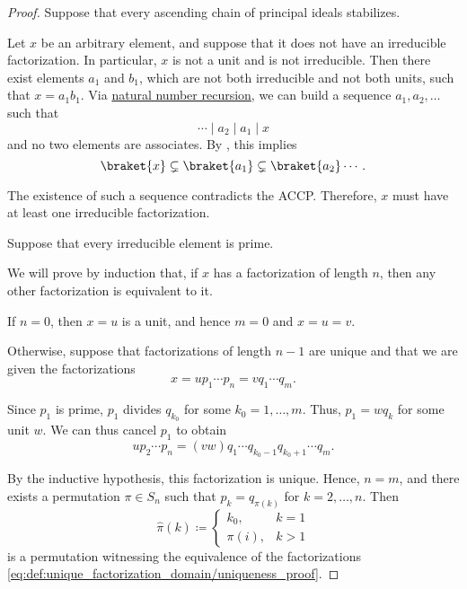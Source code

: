 \begin{proof}
   Suppose that every ascending chain of principal ideals stabilizes.

  Let \( x \) be an arbitrary element, and suppose that it does not have an irreducible factorization. In particular, \( x \) is not a unit and is not irreducible. Then there exist elements \( a_1 \) and \( b_1 \), which are not both irreducible and not both units, such that \( x = a_1 b_1 \). Via \hyperref[rem:natural_number_recursion]{natural number recursion}, we can build a sequence \( a_1, a_2, \ldots \) such that
  \begin{equation*}
    \cdots \mid a_2 \mid a_1 \mid x
  \end{equation*}
  and no two elements are associates. By , this implies
  \begin{equation*}
    \braket{ x } \subsetneq \braket{ a_1 } \subsetneq \braket{ a_2 } \cdots.
  \end{equation*}

  The existence of such a sequence contradicts the ACCP. Therefore, \( x \) must have at least one irreducible factorization.

   Suppose that every irreducible element is prime.

  We will prove by induction that, if \( x \) has a factorization of length \( n \), then any other factorization is equivalent to it.

  If \( n = 0 \), then \( x = u \) is a unit, and hence \( m = 0 \) and \( x = u = v \).

  Otherwise, suppose that factorizations of length \( n - 1 \) are unique and that we are given the factorizations
  \begin{equation}\label{eq:def:unique_factorization_domain/uniqueness_proof}
    x = u p_1 \cdots p_n = v q_1 \cdots q_m.
  \end{equation}

  Since \( p_1 \) is prime, \( p_1 \) divides \( q_{k_0} \) for some \( k_0 = 1, \ldots, m \). Thus, \( p_1 = w q_k \) for some unit \( w \). We can thus cancel \( p_1 \) to obtain
  \begin{equation*}
    u p_2 \cdots p_n = (vw) q_1 \cdots q_{k_0-1} q_{k_0+1} \cdots q_m.
  \end{equation*}

  By the inductive hypothesis, this factorization is unique. Hence, \( n = m \), and there exists a permutation \( \pi \in S_n \) such that \( p_k = q_{\pi(k)} \) for \( k = 2, \ldots, n \). Then
  \begin{equation*}
    \widehat{\pi}(k) \coloneqq \begin{cases}
      k_0,    & k = 1 \\
      \pi(i), & k > 1
    \end{cases}
  \end{equation*}
  is a permutation witnessing the equivalence of the factorizations \eqref{eq:def:unique_factorization_domain/uniqueness_proof}.
\end{proof}

